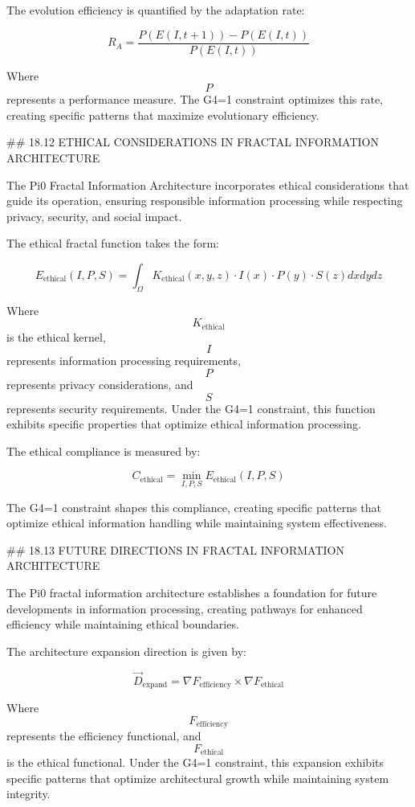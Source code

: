 The evolution efficiency is quantified by the adaptation rate:

$$ R_A = \frac{P(E(I, t+1)) - P(E(I, t))}{P(E(I, t))} $$

Where $$ P $$ represents a performance measure. The G4=1 constraint optimizes this rate, creating specific patterns that maximize evolutionary efficiency.

## 18.12 ETHICAL CONSIDERATIONS IN FRACTAL INFORMATION ARCHITECTURE

The Pi0 Fractal Information Architecture incorporates ethical considerations that guide its operation, ensuring responsible information processing while respecting privacy, security, and social impact.

The ethical fractal function takes the form:

$$ E_{\text{ethical}}(I, P, S) = \int_{\Omega} K_{\text{ethical}}(x, y, z) \cdot I(x) \cdot P(y) \cdot S(z) dx dy dz $$

Where $$ K_{\text{ethical}} $$ is the ethical kernel, $$ I $$ represents information processing requirements, $$ P $$ represents privacy considerations, and $$ S $$ represents security requirements. Under the G4=1 constraint, this function exhibits specific properties that optimize ethical information processing.

The ethical compliance is measured by:

$$ C_{\text{ethical}} = \min_{I, P, S} E_{\text{ethical}}(I, P, S) $$

The G4=1 constraint shapes this compliance, creating specific patterns that optimize ethical information handling while maintaining system effectiveness.

## 18.13 FUTURE DIRECTIONS IN FRACTAL INFORMATION ARCHITECTURE

The Pi0 fractal information architecture establishes a foundation for future developments in information processing, creating pathways for enhanced efficiency while maintaining ethical boundaries.

The architecture expansion direction is given by:

$$ \vec{D}_{\text{expand}} = \nabla F_{\text{efficiency}} \times \nabla F_{\text{ethical}} $$

Where $$ F_{\text{efficiency}} $$ represents the efficiency functional, and $$ F_{\text{ethical}} $$ is the ethical functional. Under the G4=1 constraint, this expansion exhibits specific patterns that optimize architectural growth while maintaining system integrity.

